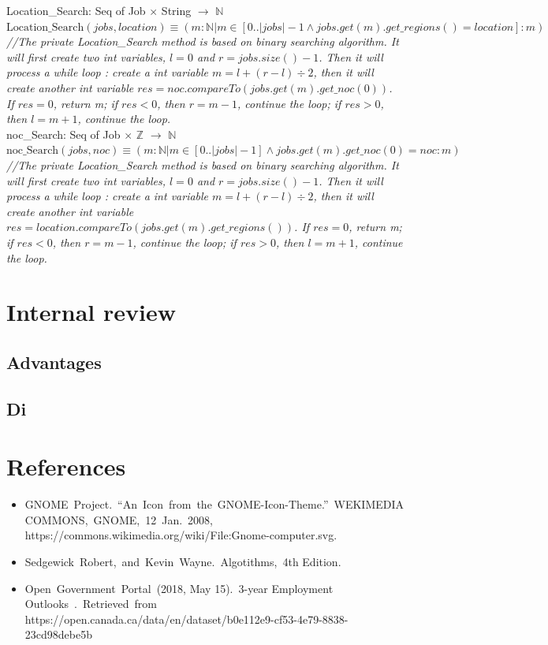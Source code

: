 \documentclass[12pt]{article}
\begin{document}
\noindent Location\_Search: Seq of Job $\times$ String  $ \rightarrow $ $\mathbb{N}$\\
\noindent $\text{Location\_Search}(jobs, location) \equiv (m: \mathbb{N} | m \in [0 .. |jobs|-1 \wedge jobs.get(m).get\_regions() = location]
: m)$\\

\noindent \textit{//The private Location\_Search method is based on binary searching algorithm. It will first create two int variables, $l = 0$ and $r = jobs.size()-1$. Then it will process a while loop : create a int variable $m = l + (r - l) \div 2$, then it will create another int variable $res = noc.compareTo(jobs.get(m).get\_noc(0))$. If $res = 0$, return m; if $res < 0$, then $r = m-1$, continue the loop; if $res > 0$, then $l = m + 1$, continue the loop.}\\

\noindent noc\_Search: Seq of Job $\times$ $\mathbb{Z}$  $ \rightarrow $ $\mathbb{N}$\\
\noindent $\text{noc\_Search}(jobs, noc) \equiv (m: \mathbb{N} | m \in [0 .. |jobs|-1] \wedge jobs.get(m).get\_noc(0) = noc
: m)$\\

\noindent \textit{//The private Location\_Search method is based on binary searching algorithm. It will first create two int variables, $l = 0$ and $r = jobs.size()-1$. Then it will process a while loop : create a int variable $m = l + (r - l) \div 2$, then it will create another int variable $res = location.compareTo(jobs.get(m).get\_regions())$. If $res = 0$, return m; if $res < 0$, then $r = m-1$, continue the loop; if $res > 0$, then $l = m + 1$, continue the loop.}\\

\section{Internal review}
\subsection*{Advantages}
\subsection*{Di}

\section{References}
\begin{itemize}
\item GNOME\ Project.\ “An\ Icon\ from\ the\ GNOME-Icon-Theme.”\ WEKIMEDIA\\ COMMONS,\ GNOME,\ 12\ Jan.\ 2008, https://commons.wikimedia.org/wiki/File:Gnome-computer.svg.
\item Sedgewick\ Robert,\ and\ Kevin\ Wayne.\ Algotithms,\ 4th Edition.
\item Open\ Government\ Portal\ (2018, May 15).\ 3-year Employment Outlooks\ .\ Retrieved\ from
https://open.canada.ca/data/en/dataset/b0e112e9-cf53-4e79-8838-23cd98debe5b
\end{itemize}
\end{document}

